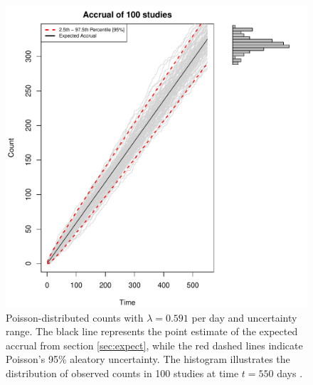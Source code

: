 \begin{figure}
\begin{knitrout}
\color{fgcolor}

{\centering \includegraphics[width=\textwidth-3cm]{figure/ch02_figunnamed-chunk-3-1} 

}


\end{knitrout}
  \caption{Poisson-distributed counts with $\lambda = 0.591$ per day and uncertainty range. The black line represents the point estimate of the expected accrual from section \ref{sec:expect}, while the red dashed lines indicate Poisson's 95\% aleatory uncertainty. The histogram illustrates the distribution of observed counts in 100 studies at time $t = 550$ days \citep{spiegelhalter2011visualizing, pkgacc}.}
  \label{fig:2_2}
\end{figure}


